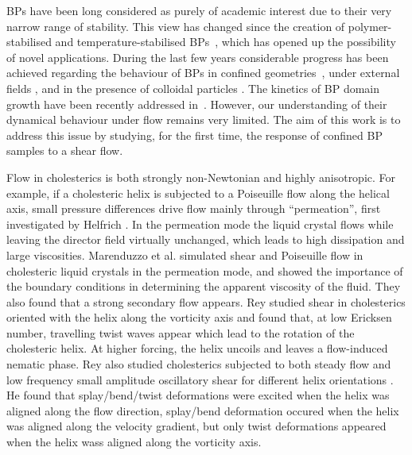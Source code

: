 \documentclass[12pt,twoside]{iopart}
\begin{document}
BPs have been long considered as purely of academic interest due to their very narrow range of stability. This view has changed since the creation of
polymer-stabilised and temperature-stabilised BPs~\cite{Kikuchi:2002,Coles:2005}, which has opened up the possibility of novel applications.
During the last few years considerable progress has been achieved regarding the behaviour of BPs in confined geometries~\cite{Fukuda:2010a, Fukuda:2010b, Ravnik:2011b}, under external fields \cite{Alexander:2008,Fukuda:2009,Henrich:2010a,Castles:2010,Tiribocchi:2011}, and in the presence of colloidal particles \cite{Ravnik:2011a}. 
The kinetics of BP domain growth have been recently addressed in~\cite{Henrich:2010b}. However, our understanding of their dynamical behaviour under flow remains
very limited. The aim of this work is to address this issue by studying,
for the first time, the response of confined BP samples to a shear flow.

Flow in cholesterics is both strongly non-Newtonian and highly anisotropic.
For example, if a cholesteric helix is subjected to a Poiseuille flow along
the helical axis, small pressure differences drive flow mainly through
``permeation'', first investigated by Helfrich \cite{Helfrich:1969}.
In the permeation mode the liquid crystal flows while leaving the director
field virtually unchanged, which leads to high dissipation and large
viscosities. Marenduzzo et al. \cite{Marenduzzo:2006a,Marenduzzo:2006b} simulated shear and Poiseuille flow in cholesteric liquid crystals in the permeation mode, and showed the importance of the boundary conditions in determining the apparent viscosity of the fluid. They also found that a strong secondary flow appears.
Rey \cite{Rey:1996a, Rey:1996b} studied shear in cholesterics oriented with the helix along the vorticity axis and found that, at low Ericksen number, travelling twist waves appear which lead to the rotation of the cholesteric helix. At higher forcing, the helix uncoils and leaves a flow-induced nematic phase. 
Rey also studied cholesterics subjected to both steady flow and low frequency
small amplitude oscillatory shear for different helix orientations
\cite{Rey:2000, Rey:2002}. He found that splay/bend/twist deformations were
excited when the helix was aligned along the flow direction, splay/bend
deformation occured when the helix was aligned along the velocity gradient,
but only twist deformations
appeared when the helix wass aligned along the vorticity axis.
\end{document}
